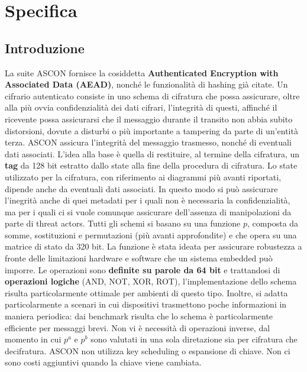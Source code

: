\section{Specifica}
\subsection{Introduzione}
La suite ASCON fornisce la cosiddetta \textbf{Authenticated Encryption with Associated Data (AEAD)}, nonché le funzionalità di hashing già citate.
\newline
Un cifrario autenticato consiste in uno schema di cifratura che possa assicurare, oltre alla più ovvia confidenzialità dei dati cifrari, l'integrità di questi, affinché il ricevente possa assicurarsi che il messaggio durante il transito non abbia subito distorsioni, dovute a disturbi o più importante a tampering da parte di un'entità terza. ASCON assicura l'integrità del messaggio trasmesso, nonché di eventuali dati associati. L'idea alla base è quella di restituire, al termine della cifratura, un \textbf{tag} da 128 bit estratto dallo state alla fine della procedura di cifratura. Lo state utilizzato per la cifratura, con riferimento ai diagrammi più avanti riportati, dipende anche da eventuali dati associati. In questo modo si può assicurare l'inegrità anche di quei metadati per i quali non è necessaria la confidenzialità, ma per i quali ci si vuole comunque assicurare dell'assenza di manipolazioni da parte di threat actors.
\newline\newline
Tutti gli schemi si basano su una funzione $p$, composta da somme, sostituzioni e permutazioni (più avanti approfondite) e che opera su una matrice di stato da 320 bit. La funzione è stata ideata per assicurare robustezza a fronte delle limitazioni hardware e software che un sistema embedded può imporre. Le operazioni sono \textbf{definite su parole da 64 bit} e trattandosi di \textbf{operazioni logiche} (AND, NOT, XOR, ROT), l'implementazione dello schema risulta particolarmente ottimale per ambienti di questo tipo. Inoltre, si adatta particolarmente a scenari in cui dispositivi trasmettono poche informazioni in maniera periodica: dai benchmark risulta che lo schema è particolarmente efficiente per messaggi brevi.
\newline\newline
Non vi è necessità di operazioni inverse, dal momento in cui $p^a$ e $p^b$ sono valutati in una sola diretazione sia per cifratura che decifratura. 
\newline\newline
ASCON non utilizza key scheduling o espansione di chiave. Non ci sono costi aggiuntivi quando la chiave viene cambiata. 

